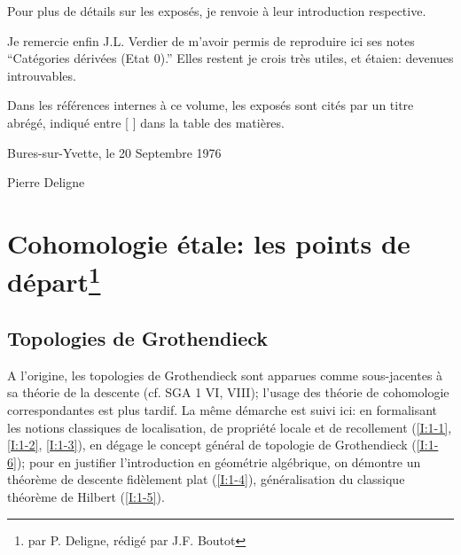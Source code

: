 \documentclass{book}
\begin{document}
Pour plus de détails sur les exposés, je renvoie à leur introduction 
respective. 

Je remercie enfin J.L. Verdier de m'avoir permis de reproduire ici ses notes 
``Catégories dérivées (Etat $0$).'' Elles restent je crois très utiles, et 
étaien: devenues introuvables. 

Dans les références internes à ce volume, les exposés sont cités par 
un titre abrégé, indiqué entre [ ] dans la table des matières. 

Bures-sur-Yvette, le 20 Septembre 1976

Pierre Deligne











\tableofcontents




















\chapter{Cohomologie étale: les points de départ\texorpdfstring{\footnote{par P. Deligne, rédigé par J.F. Boutot}}{}}




















\section{Topologies de Grothendieck}\label{I:1}

A l'origine, les topologies de Grothendieck sont apparues comme sous-jacentes 
à sa théorie de la descente (cf. SGA 1 VI, VIII); l'usage des théorie de 
cohomologie correspondantes est plus tardif. La même démarche est suivi 
ici: en formalisant les notions classiques de localisation, de propriété 
locale et de recollement (\ref{I:1-1}, \ref{I:1-2}, \ref{I:1-3}), en dégage le 
concept général de topologie de Grothendieck (\ref{I:1-6}); pour en justifier 
l'introduction en géométrie algébrique, on démontre un théorème 
de descente fidèlement plat (\ref{I:1-4}), généralisation du classique théorème 
de Hilbert (\ref{I:1-5}). 
\end{document}
